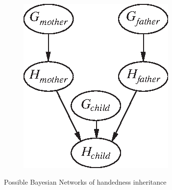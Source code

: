 \documentclass[9pt,a4paper]{extarticle}
\begin{document}
\begin{figure}
\begin{subfigure}{.3\linewidth}
\caption{}
\label{fig:sub1}
\end{subfigure}%
\begin{subfigure}{.3\linewidth}
\centering
\includegraphics[width=1.\textwidth]{figures/handedness3.eps}
\caption{}
\label{fig:sub1}
\end{subfigure}%
\caption{Possible Bayesian Networks of handedness inheritance}
\label{fig:test}
\end{figure}
\end{document}
